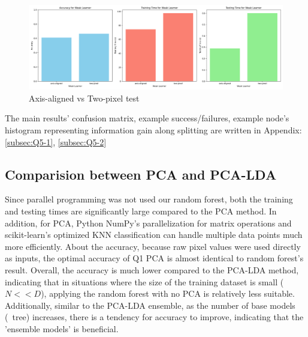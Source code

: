 \begin{figure}[htbp]
	\centering
	\includegraphics[width=0.8\linewidth]{image/q5-fig7.png}
	
	\caption{Axis-aligned vs Two-pixel test}
	\label{fig:q5-fig7}
\end{figure}
\vspace{-0.3cm}

The main results' confusion matrix, example success/failures, example node's histogram representing information gain along splitting are written in Appendix: \ref{subsec:Q5-1}, \ref{subsec:Q5-2}

\subsection{Comparision between PCA and PCA-LDA}
Since parallel programming was not used our random forest, both the training and testing times are significantly large compared to the PCA method. In addition, for PCA, Python NumPy’s parallelization for matrix operations and scikit-learn’s optimized KNN classification can handle multiple data points much more efficiently.
About the accuracy, because raw pixel values were used directly as inputs, the optimal accuracy of Q1 PCA is almost identical to random forest's result. Overall, the accuracy is much lower compared to the PCA-LDA method, indicating that in situations where the size of the training dataset is small ($N << D$), applying the random forest with no PCA is relatively less suitable. Additionally, similar to the PCA-LDA ensemble, as the number of base models (~tree) increases, there is a tendency for accuracy to improve, indicating that the 'ensemble models' is beneficial.
